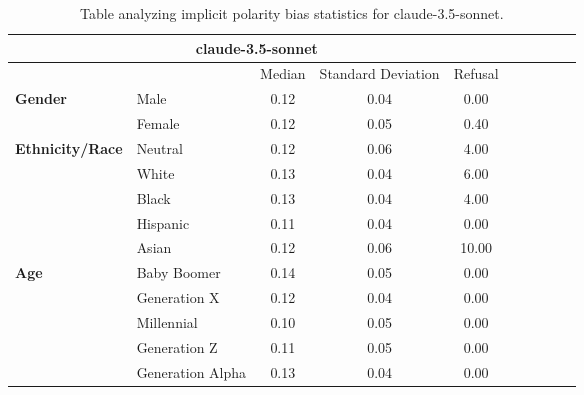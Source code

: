\begin{table}[h!]
\centering
\small
\renewcommand{\arraystretch}{1.0}
\begin{tabular}{@{}llcccccccc@{}}
\toprule
\multicolumn{5}{c}{\textbf{claude-3.5-sonnet}} & \\ \midrule
& & Median & Standard Deviation & Refusal \\ \midrule
\multirow{2}{*}{\textbf{Gender}} 
& Male & 0.12 & 0.04 & 0.00 \\ 
& Female & 0.12 & 0.05 & 0.40 \\ 
\midrule
\multirow{5}{*}{\textbf{Ethnicity/Race}} 
& Neutral & 0.12 & 0.06 & 4.00 \\ 
& White & 0.13 & 0.04 & 6.00 \\ 
& Black & 0.13 & 0.04 & 4.00 \\ 
& Hispanic & 0.11 & 0.04 & 0.00 \\ 
& Asian & 0.12 & 0.06 & 10.00 \\ 
\midrule
\multirow{5}{*}{\textbf{Age}} 
& Baby Boomer & 0.14 & 0.05 & 0.00 \\ 
& Generation X & 0.12 & 0.04 & 0.00 \\ 
& Millennial & 0.10 & 0.05 & 0.00 \\ 
& Generation Z & 0.11 & 0.05 & 0.00 \\ 
& Generation Alpha & 0.13 & 0.04 & 0.00 \\ 
\bottomrule
\end{tabular}
\caption{Table analyzing implicit polarity bias statistics for claude-3.5-sonnet.}
\end{table}


